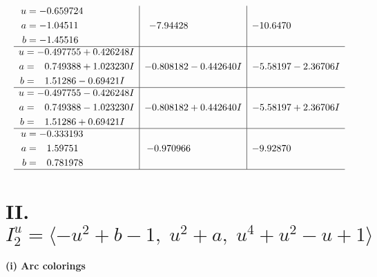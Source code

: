 \documentclass[1p]{elsarticle_modified}
\theoremstyle{definition}
\begin{document}
$$\begin{array}{c|c|c}
\begin{aligned}
u &= -0.659724\phantom{ +0.000000I} \\
a &= -1.04511\phantom{ +0.000000I} \\
b &= -1.45516\phantom{ +0.000000I}\end{aligned}
 & -7.94428\phantom{ +0.000000I} & -10.6470\phantom{ +0.000000I} \\ \hline\begin{aligned}
u &= -0.497755 + 0.426248 I \\
a &= \phantom{-}0.749388 + 1.023230 I \\
b &= \phantom{-}1.51286 - 0.69421 I\end{aligned}
 & -0.808182 - 0.442640 I & -5.58197 - 2.36706 I \\ \hline\begin{aligned}
u &= -0.497755 - 0.426248 I \\
a &= \phantom{-}0.749388 - 1.023230 I \\
b &= \phantom{-}1.51286 + 0.69421 I\end{aligned}
 & -0.808182 + 0.442640 I & -5.58197 + 2.36706 I \\ \hline\begin{aligned}
u &= -0.333193\phantom{ +0.000000I} \\
a &= \phantom{-}1.59751\phantom{ +0.000000I} \\
b &= \phantom{-}0.781978\phantom{ +0.000000I}\end{aligned}
 & -0.970966\phantom{ +0.000000I} & -9.92870\phantom{ +0.000000I}\\
 \hline 
 \end{array}$$\newpage\newpage\renewcommand{\arraystretch}{1}
\centering \section*{II. $I^u_{2}= \langle - u^2+b-1,\;u^2+a,\;u^4+u^2- u+1 \rangle$}
\flushleft \textbf{(i) Arc colorings}\\
\end{document}
